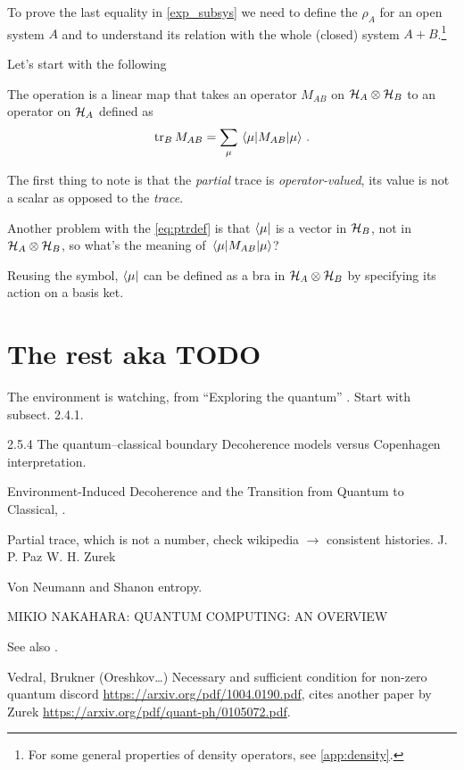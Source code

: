 To prove the last equality in \eqref{exp_subsys} we need to define the
 $\rho_A$ for an open system $A$ and to understand its
relation with the whole (closed) system $A+B$.\footnote{
  For some general properties of density operators, see \ref{app:density}.
}

Let's start with the following
\begin{definition}
  The  operation
  is a linear map
  that takes an operator
  $M_{AB}$ on $\mathcal{H}_A \otimes \mathcal{H}_B$
  to an operator on $\mathcal{H}_A$ defined as
  \begin{equation}\label{eq:ptrdef}
    \tr_B M_{AB} = \sum_{\mu} \matrixel{\mu}{M_{AB}}{\mu}
    \, .
  \end{equation}
\end{definition}

The first thing to note is that the \emph{partial} trace is \emph{operator-valued},
its value is not a scalar as opposed to the \emph{trace}.

Another problem with the \eqref{eq:ptrdef} is that $\bra{\mu}$
is a vector in $\mathcal{H}_B$, not in $\mathcal{H}_A\otimes\mathcal{H}_B$,
so what's the meaning of $\matrixel{\mu}{M_{AB}}{\mu}$?

Reusing the symbol,
$\bra{\mu}$ can be defined as a bra in $\mathcal{H}_A\otimes\mathcal{H}_B$
by specifying its action on a basis ket.



\section{The rest aka TODO}

The environment is watching, from ``Exploring the quantum''
\parencite[Ch. 4]{Haroche_Exploring}. Start with subsect. 2.4.1.

2.5.4 The quantum–classical boundary
Decoherence models versus Copenhagen interpretation.

Environment-Induced Decoherence and the Transition from Quantum to Classical,
\cite{Zurek_Fundamentals}.

Partial trace, which is not a number, check wikipedia $\rightarrow$ consistent histories.
J. P. Paz W. H. Zurek

Von Neumann and Shanon entropy.

MIKIO NAKAHARA: QUANTUM COMPUTING: AN OVERVIEW

See also \cite{Schlosshauer_Decoherence}.

Vedral, Brukner (Oreshkov\dots)
Necessary and sufficient condition for non-zero quantum discord
\url{https://arxiv.org/pdf/1004.0190.pdf},
cites another paper by Zurek \url{https://arxiv.org/pdf/quant-ph/0105072.pdf}.

